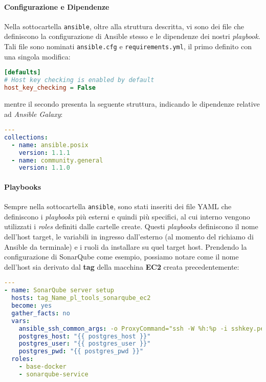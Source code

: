 \documentclass[../main.tex]{subfiles}
\begin{document}
                \paragraph{Configurazione e Dipendenze}
                Nella sottocartella \verb|ansible|, oltre alla struttura descritta, vi sono dei file che definiscono la configurazione di Ansible stesso e le dipendenze dei nostri \emph{playbook}. Tali file sono nominati \verb|ansible.cfg| e \verb|requirements.yml|, il primo definito con una singola modifica:
                \begin{lstlisting}[language={Ini}]
[defaults]
# Host key checking is enabled by default
host_key_checking = False
                \end{lstlisting}
                mentre il secondo presenta la seguente struttura, indicando le dipendenze relative ad \emph{Ansible Galaxy}:
                \begin{lstlisting}[language=yaml]
---
collections:
  - name: ansible.posix
    version: 1.1.1
  - name: community.general
    version: 1.1.0
                \end{lstlisting}
                
                \paragraph{Playbooks}
                Sempre nella sottocartella \verb|ansible|, sono stati inseriti dei file YAML che definiscono i \emph{playbooks} più esterni e quindi più specifici, al cui interno vengono utilizzati i \emph{roles} definiti dalle cartelle create. Questi \emph{playbooks} definiscono il nome dell'host target, le variabili in ingresso dall'esterno (al momento del richiamo di Ansible da terminale) e i ruoli da installare su quel target host. Prendendo la configurazione di SonarQube come esempio, possiamo notare come il nome dell'host sia derivato dal \textbf{tag} della macchina \textbf{EC2} creata precedentemente:
                \begin{lstlisting}[language=yaml]
---
- name: SonarQube server setup
  hosts: tag_Name_pl_tools_sonarqube_ec2
  become: yes
  gather_facts: no
  vars:
    ansible_ssh_common_args: -o ProxyCommand="ssh -W %h:%p -i sshkey.pem ec2-user@{{ bastion }}"
    postgres_host: "{{ postgres_host }}"
    postgres_user: "{{ postgres_user }}"
    postgres_pwd: "{{ postgres_pwd }}"
  roles:
    - base-docker
    - sonarqube-service
                \end{lstlisting}
                
\end{document}
